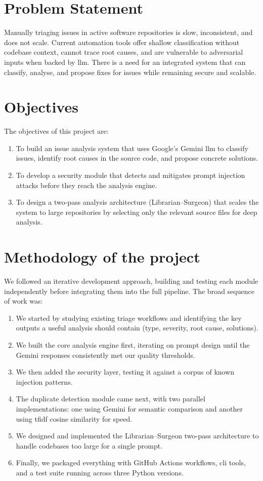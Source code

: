 \section{Problem Statement}

Manually triaging issues in active software repositories is slow, inconsistent, and does not scale. Current automation tools offer shallow classification without codebase context, cannot trace root causes, and are vulnerable to adversarial inputs when backed by \gls{llm}. There is a need for an integrated system that can classify, analyse, and propose fixes for issues while remaining secure and scalable.

\section{Objectives}
The objectives of this project are:
\begin{enumerate}
\item To build an issue analysis system that uses Google's Gemini \gls{llm} to classify issues, identify root causes in the source code, and propose concrete solutions.
\item To develop a security module that detects and mitigates prompt injection attacks before they reach the analysis engine.
\item To design a two-pass analysis architecture (Librarian--Surgeon) that scales the system to large repositories by selecting only the relevant source files for deep analysis.
\end{enumerate}

\section{Methodology of the project}
We followed an iterative development approach, building and testing each module independently before integrating them into the full pipeline. The broad sequence of work was:

\begin{enumerate}
\item We started by studying existing triage workflows and identifying the key outputs a useful analysis should contain (type, severity, root cause, solutions).
\item We built the core analysis engine first, iterating on prompt design until the Gemini responses consistently met our quality thresholds.
\item We then added the security layer, testing it against a corpus of known injection patterns.
\item The duplicate detection module came next, with two parallel implementations: one using Gemini for semantic comparison and another using \gls{tfidf} cosine similarity for speed.
\item We designed and implemented the Librarian--Surgeon two-pass architecture to handle codebases too large for a single prompt.
\item Finally, we packaged everything with GitHub Actions workflows, \gls{cli} tools, and a test suite running across three Python versions.
\end{enumerate}

